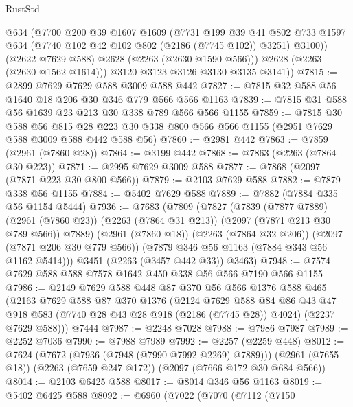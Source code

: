 \begin{lexlean}{RustStd}
\begin{coremodule}
{\begin{coremodule}
{{{{{{{{{{{{{{{            @634
            (@7700
              @200
              @39
              @1607
              @1609
              (@7731
                @199
                @39
                @41
                @802
                @733
                @1597
                @634
                (@7740 @102 @42 @102 @802 (@2186 (@7745 @102)) @3251)
                @3100))
            (@2622 @7629 @588)
            @2628
            (@2263 (@2630 @1590 @566)))
          @2628
          (@2263 (@2630 @1562 @1614)))
        @3120
        @3123
        @3126
        @3130
        @3135
        @3141))
@7815 := @2899 @7629 @7629 @588 @3009 @588 @442
@7827 := @7815 @32 @588 @56 @1640 @18 @206 @30 @346 @779 @566 @566 @1163
@7839 := @7815 @31 @588 @56 @1639 @23 @213 @30 @338 @789 @566 @566 @1155
@7859 := @7815
    @30
    @588
    @56
    @815
    @28
    @223
    @30
    @338
    @800
    @566
    @566
    @1155
    (@2951 @7629 @588 @3009 @588 @442 @588 @56)
@7860 := @2981 @442
@7863 := @7859 (@2961 (@7860 @28))
@7864 := @3199 @442
@7868 := @7863 (@2263 (@7864 @30 @223))
@7871 := @2995 @7629 @3009 @588
@7877 := @7868 (@2097 (@7871 @223 @30 @800 @566))
@7879 := @2103 @7629 @588
@7882 := @7879 @338 @56 @1155
@7884 := @5402 @7629 @588
@7889 := @7882 (@7884 @335 @56 @1154 @5444)
@7936 := @7683
    (@7809
      (@7827
        (@7839
          (@7877 @7889)
          (@2961 (@7860 @23))
          (@2263 (@7864 @31 @213))
          (@2097 (@7871 @213 @30 @789 @566))
          @7889)
        (@2961 (@7860 @18))
        (@2263 (@7864 @32 @206))
        (@2097 (@7871 @206 @30 @779 @566))
        (@7879 @346 @56 @1163 (@7884 @343 @56 @1162 @5414)))
      @3451
      (@2263 (@3457 @442 @33))
      @3463)
@7948 := @7574 @7629 @588 @588 @7578 @1642 @450 @338 @56 @566 @7190 @566 @1155
@7986 := @2149
    @7629
    @588
    @448
    @87
    @370
    @56
    @566
    @1376
    @588
    @465
    (@2163
      @7629
      @588
      @87
      @370
      @1376
      (@2124
        @7629
        @588
        @84
        @86
        @43
        @47
        @918
        @583
        (@7740 @28 @43 @28 @918 (@2186 (@7745 @28)) @4024)
        (@2237 @7629 @588)))
    @7444
@7987 := @2248 @7028
@7988 := @7986 @7987
@7989 := @2252 @7036
@7990 := @7988 @7989
@7992 := @2257 (@2259 @448)
@8012 := @7624
    (@7672 (@7936 (@7948 (@7990 @7992 @2269) @7889)))
    (@2961 (@7655 @18))
    (@2263 (@7659 @247 @172))
    (@2097 (@7666 @172 @30 @684 @566))
@8014 := @2103 @6425 @588
@8017 := @8014 @346 @56 @1163
@8019 := @5402 @6425 @588
@8092 := @6960
    (@7022
      (@7070
        (@7112
          (@7150
}}}}}}}}}}}}}}}
\end{coremodule}}
\end{coremodule}
\end{lexlean}
